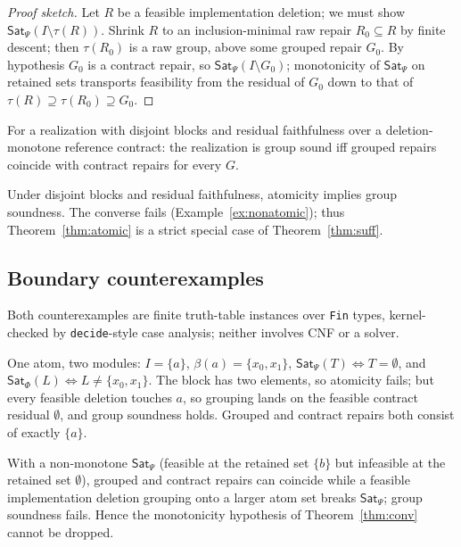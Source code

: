 \documentclass[sigplan,10pt,review,anonymous,nonacm]{acmart}
\theoremstyle{acmdefinition}
\newcommand{\code}[1]{\texttt{#1}}
\newcommand{\SatPsi}{{\mathsf{Sat}_\Psi}}
\newcommand{\SatPhi}{{\mathsf{Sat}_\Phi}}
\begin{document}
\begin{proof}[Proof sketch]
Let $R$ be a feasible implementation deletion; we must show
$\SatPsi(I \setminus \tau(R))$. Shrink $R$ to an inclusion-minimal raw repair
$R_0 \subseteq R$ by finite descent; then $\tau(R_0)$ is a raw group, above
some grouped repair $G_0$. By hypothesis $G_0$ is a contract repair, so
$\SatPsi(I \setminus G_0)$; monotonicity of $\SatPsi$ on retained sets
transports feasibility from the residual of $G_0$ down to that of
$\tau(R) \supseteq \tau(R_0) \supseteq G_0$.
\end{proof}

\begin{theorem}[Characterization]
\label{thm:iff}
For a realization with disjoint blocks and residual faithfulness over a
deletion-monotone reference contract: the realization is group sound iff
grouped repairs coincide with contract repairs for every $G$.
\end{theorem}

\begin{lemma}[Hierarchy]
\label{lem:hier}
Under disjoint blocks and residual faithfulness, atomicity implies group
soundness. The converse fails (Example~\ref{ex:nonatomic}); thus
Theorem~\ref{thm:atomic} is a strict special case of Theorem~\ref{thm:suff}.
\end{lemma}

\subsection{Boundary counterexamples}
\label{sec:cex}

Both counterexamples are finite truth-table instances over \code{Fin} types,
kernel-checked by \code{decide}-style case analysis; neither involves CNF or
a solver.

\begin{example}
\label{ex:nonatomic}
One atom, two modules: $I = \{a\}$, $\beta(a) = \{x_0, x_1\}$,
$\SatPsi(T) \iff T = \emptyset$, and $\SatPhi(L) \iff L \neq \{x_0,x_1\}$.
The block has two elements, so atomicity fails; but every feasible deletion
touches $a$, so grouping lands on the feasible contract residual
$\emptyset$, and group soundness holds. Grouped and contract repairs both
consist of exactly $\{a\}$.
\end{example}

\begin{example}
\label{ex:nonmono}
With a non-monotone $\SatPsi$ (feasible at the retained set $\{b\}$ but
infeasible at the retained set $\emptyset$), grouped and contract repairs can
coincide while a feasible implementation deletion grouping onto a larger atom
set breaks $\SatPsi$; group soundness fails. Hence the monotonicity
hypothesis of Theorem~\ref{thm:conv} cannot be dropped.
\end{example}
\end{document}
